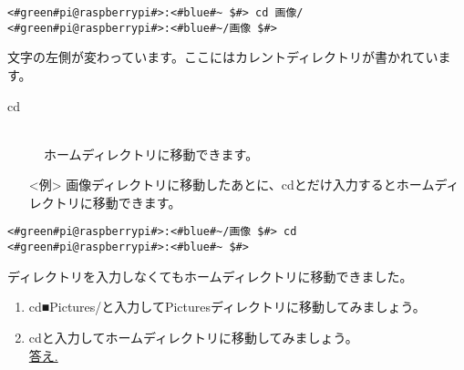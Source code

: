 \begin{lstlisting}[caption=cd directoryの例, label=cdDir]
<#green#pi@raspberrypi#>:<#blue#~ $#> cd 画像/
<#green#pi@raspberrypi#>:<#blue#~/画像 $#>
\end{lstlisting}
文字の左側が変わっています。ここにはカレントディレクトリが書かれています。

\begin{description}
\item[cd]\mbox{}\\
ホームディレクトリに移動できます。
\end{description}
\begin{itemize}
\item[<例>] 画像ディレクトリに移動したあとに、cdとだけ入力するとホームディレクトリに移動できます。
\end{itemize}
\begin{lstlisting}[caption=cdの例, label=cd]
<#green#pi@raspberrypi#>:<#blue#~/画像 $#> cd
<#green#pi@raspberrypi#>:<#blue#~ $#> 
\end{lstlisting}
ディレクトリを入力しなくてもホームディレクトリに移動できました。

\begin{tcolorbox}[title=\useOmetoi]
\begin{enumerate}
\item cd■Pictures/と入力してPicturesディレクトリに移動してみましょう。\\
\item cdと入力してホームディレクトリに移動してみましょう。\\
\underline{答え.\hspace{0.8\linewidth}}
\end{enumerate}
\end{tcolorbox}

